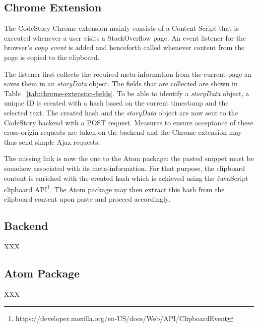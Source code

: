 \documentclass[../manifest.tex]{subfiles}
\begin{document}
\subsection{Chrome Extension}
The CodeStory Chrome extension mainly consists of a Content Script that is executed whenever a user visits a StackOverflow page. An event listener for the browser's \textit{copy event} is added and henceforth called whenever content from the page is copied to the clipboard.

The listener first collects the required meta-information from the current page an saves them in an \textit{storyData} object. The fields that are collected are shown in Table ~\ref{tab:chrome-extension-fields}. To be able to identify a \textit{storyData} object, a unique ID is created with a hash based on the current timestamp and the selected text. The created hash and the \textit{storyData} object are now sent to the CodeStory backend with a POST request. Measures to ensure acceptance of these cross-origin requests are taken on the backend and the Chrome extension may thus send simple Ajax requests.

The missing link is now the one to the Atom package: the pasted snippet must be somehow associated with its meta-information. For that purpose, the clipboard content is enriched with the created hash which is achieved using the JavaScript clipboard API\footnote{https://developer.mozilla.org/en-US/docs/Web/API/ClipboardEvent}. The Atom package may then extract this hash from the clipboard content upon paste and proceed accordingly.

\subsection{Backend}
XXX

\subsection{Atom Package}
XXX
\end{document}
